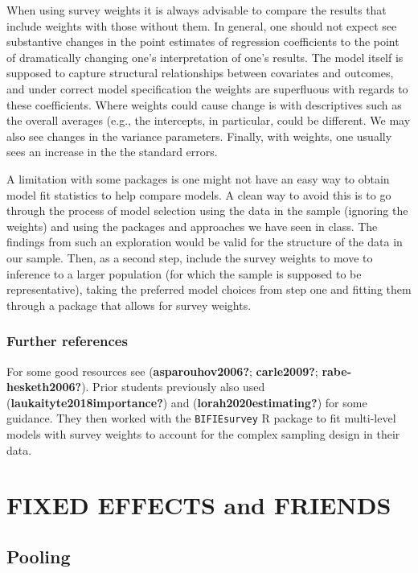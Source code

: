 \documentclass[
  letterpaper,
  DIV=11,
  numbers=noendperiod]{scrreprt}
\begin{document}
When using survey weights it is always advisable to compare the results
that include weights with those without them. In general, one should not
expect see substantive changes in the point estimates of regression
coefficients to the point of dramatically changing one's interpretation
of one's results. The model itself is supposed to capture structural
relationships between covariates and outcomes, and under correct model
specification the weights are superfluous with regards to these
coefficients. Where weights could cause change is with descriptives such
as the overall averages (e.g., the intercepts, in particular, could be
different. We may also see changes in the variance parameters. Finally,
with weights, one usually sees an increase in the the standard errors.

A limitation with some packages is one might not have an easy way to
obtain model fit statistics to help compare models. A clean way to avoid
this is to go through the process of model selection using the data in
the sample (ignoring the weights) and using the packages and approaches
we have seen in class. The findings from such an exploration would be
valid for the structure of the data in our sample. Then, as a second
step, include the survey weights to move to inference to a larger
population (for which the sample is supposed to be representative),
taking the preferred model choices from step one and fitting them
through a package that allows for survey weights.

\section{Further references}\label{further-references}

For some good resources see (\textbf{asparouhov2006?};
\textbf{carle2009?}; \textbf{rabe-hesketh2006?}). Prior students
previously also used (\textbf{laukaityte2018importance?}) and
(\textbf{lorah2020estimating?}) for some guidance. They then worked with
the \texttt{BIFIEsurvey} R package to fit multi-level models with survey
weights to account for the complex sampling design in their data.

\part{FIXED EFFECTS and FRIENDS}

\chapter{Pooling}\label{pooling}
\end{document}
